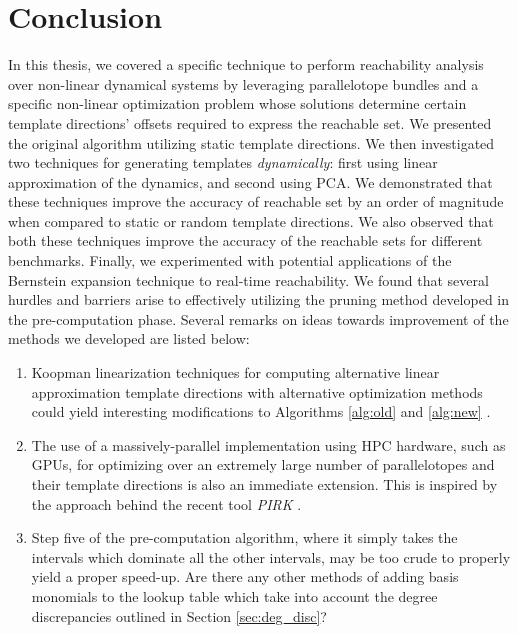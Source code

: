 \chapter{Conclusion}
\label{chap:conclusion}
In this thesis, we covered a specific technique to perform reachability analysis over non-linear dynamical systems by leveraging parallelotope bundles and a specific non-linear optimization problem whose solutions determine certain template directions' offsets required to express the reachable set.
%
We presented the original algorithm utilizing static template directions.
%
We then investigated two techniques for generating templates \emph{dynamically}: first using linear approximation of the dynamics, and second using PCA.
%
We demonstrated that these techniques improve the accuracy of reachable set by an order of magnitude when compared to static or random template directions.
%
We also observed that both these techniques improve the accuracy of the reachable sets for different benchmarks.
%
Finally, we experimented with potential applications of the Bernstein expansion technique to real-time reachability. We found that several hurdles and barriers arise to effectively utilizing the pruning method developed in the pre-computation phase.
%
Several remarks on ideas towards improvement of the methods we developed are listed below:
\begin{enumerate}
  \item Koopman linearization techniques for computing alternative linear approximation template directions with alternative optimization methods could yield interesting modifications to Algorithms \ref{alg:old} and \ref{alg:new} \cite{bak2021reachability}.

  \item The use of a massively-parallel implementation using HPC hardware, such as GPUs, for optimizing over an extremely large number of parallelotopes and their template directions is also an immediate extension. This is inspired by the approach behind the recent tool \emph{PIRK} \cite{devonport2020pirk}.

  \item Step five of the pre-computation algorithm, where it simply takes the intervals which dominate all the other intervals, may be too crude to properly yield a proper speed-up. Are there any other methods of adding basis monomials to the lookup table which take into account the degree discrepancies outlined in Section \ref{sec:deg_disc}?
\end{enumerate}

%
